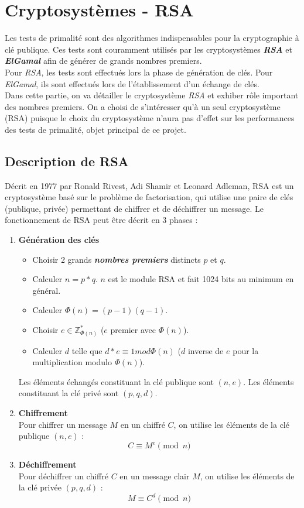 \section{Cryptosystèmes - RSA}

	Les tests de primalité sont des algorithmes indispensables pour la cryptographie à clé publique. Ces tests sont couramment utilisés par les cryptosystèmes \textbf{\textit{RSA}} et \textbf{\textit{ElGamal}} afin de générer de grands nombres premiers.\\
	\indent Pour \textit{RSA}, les tests sont effectués lors la phase de génération de clés. Pour \textit{ElGamal}, ils sont effectués lors de l'établissement d'un échange de clés.\\
	\indent Dans cette partie, on va détailler le cryptosystème \textit{RSA} et exhiber rôle important des nombres premiers. On a choisi de s'intéresser qu'à un seul cryptosystème (RSA) puisque le choix du cryptosystème n'aura pas d'effet sur les performances des tests de primalité, objet principal de ce projet.
	
	\subsection{Description de RSA}
	Décrit en 1977 par Ronald Rivest, Adi Shamir et Leonard Adleman, RSA est un cryptosystème basé sur le problème de factorisation, qui utilise une paire de clés (publique, privée) permettant de chiffrer et de déchiffrer un message. Le fonctionnement de RSA peut être décrit en 3 phases :
		\begin{enumerate}[leftmargin=2em]
			\vspace{1em}
			\item \textbf{Génération des clés} 
			\begin{itemize}
				\item Choisir 2 grands \textbf{\textit{nombres premiers}} distincts $p$ et $q$.
				\item Calculer $n = p * q$. $n$ est le module RSA et fait 1024 bits au minimum en général.
				\item Calculer $\Phi(n) = (p - 1)(q - 1)$.
				\item Choisir $e \in \mathbb{Z}_{\Phi(n)}^{*}$ ($e$ premier avec $\Phi(n)$).
				\item Calculer $d$ telle que $d*e \equiv 1 mod \Phi(n)$ ($d$ inverse de $e$ pour la multiplication modulo $\Phi(n)$).
			\end{itemize}
			Les éléments échangés constituant la clé publique sont $(n, e)$. Les éléments constituant la clé privé sont $(p, q, d)$.
			\vspace{1em}
			\item \textbf{Chiffrement}\\
			Pour chiffrer un message $M$ en un chiffré $C$, on utilise les éléments de la clé publique $(n, e)$ :
			\[C \equiv M^{e} \pmod n\]		
			
			\item \textbf{Déchiffrement}\\
			Pour déchiffrer un chiffré $C$ en un message clair $M$, on utilise les éléments de la clé privée $(p, q, d)$ :
			\[M \equiv C^{d} \pmod n\]
		\end{enumerate}
		
